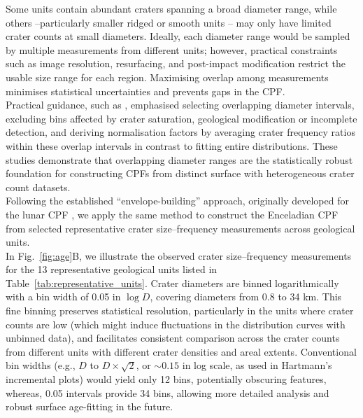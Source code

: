 \documentclass[preprint,11pt,3p,times,authoryear]{elsarticle}
\begin{document}
Some units contain abundant craters spanning a broad diameter range, while others --particularly smaller ridged or smooth units -- may only have limited crater counts at small diameters. Ideally, each diameter range would be sampled by multiple measurements from different units; however, practical constraints such as image resolution, resurfacing, and post-impact modification restrict the usable size range for each region. Maximising overlap among measurements minimises statistical uncertainties and prevents gaps in the CPF.\\

Practical guidance, such as \citet{Neukum1983,Xiao2015,Robbins2018}, emphasised selecting overlapping diameter intervals, excluding bins affected by crater saturation, geological modification or incomplete detection, and deriving normalisation factors by averaging crater frequency ratios within these overlap intervals in contrast to fitting entire distributions. These studies demonstrate that overlapping diameter ranges are the statistically robust foundation for constructing CPFs from distinct surface with heterogeneous crater count datasets.\\

Following the established ``envelope-building'' approach, originally developed for the lunar CPF \citep{Neukum1983}, we apply the same method to construct the Enceladian CPF from selected representative crater size–frequency measurements across geological units. \\

In Fig.~\ref{fig:age}B, we illustrate the observed crater size–frequency measurements for the 13 representative geological units listed in Table~\ref{tab:representative_units}. Crater diameters are binned logarithmically with a bin width of 0.05 in $\log D$, covering diameters from 0.8 to 34 km. This fine binning preserves statistical resolution, particularly in the units where crater counts are low (which might induce fluctuations in the distribution curves with unbinned data), and facilitates consistent comparison across the crater counts from different units with different crater densities and areal extents.
Conventional bin widths (e.g., $D$ to $D \times \sqrt{2}$, or $\sim0.15$ in log scale, as used in Hartmann's incremental plots) would yield only 12 bins, potentially obscuring features, whereas, 0.05 intervals provide 34 bins, allowing more detailed analysis and robust surface age-fitting in the future.\\
\end{document}
